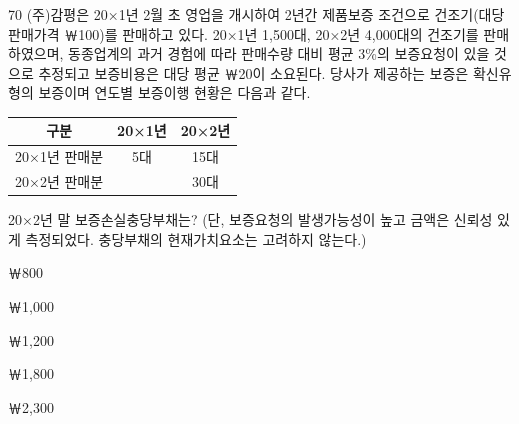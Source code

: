 \begin{question}{70}
(주)감평은 20×1년 2월 초 영업을 개시하여 2년간 제품보증 조건으로 건조기(대당 판매가격 ￦100)를 판매하고 있다. 20×1년 1,500대, 20×2년 4,000대의 건조기를 판매하였으며, 동종업계의 과거 경험에 따라 판매수량 대비 평균 3\%의 보증요청이 있을 것으로 추정되고 보증비용은 대당 평균 ￦20이 소요된다. 당사가 제공하는 보증은 확신유형의 보증이며 연도별 보증이행 현황은 다음과 같다.

{\small\centering\begin{tabular}{|c|c|c|}\hline
구분 & 20×1년 & 20×2년 \\ \hline
20×1년 판매분 & 5대 & 15대 \\ \hline
20×2년 판매분 & & 30대 \\ \hline
\end{tabular}\par}
\vspace{4pt}
20×2년 말 보증손실충당부채는? (단, 보증요청의 발생가능성이 높고 금액은 신뢰성 있게 측정되었다. 충당부채의 현재가치요소는 고려하지 않는다.)
\begin{choices}
  \item ￦800
  \item ￦1,000
  \item ￦1,200
  \item ￦1,800
  \item ￦2,300
\end{choices}
\end{question}
